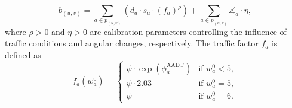 \documentclass[lettersize,journal]{IEEEtran}
\begin{document}
\begin{equation}
\label{cyclist_distance}
    b_{(u,v)} = \sum_{a \in p_{(u,v)}} \left( d_a \cdot s_a \cdot (f_a)^{\rho} \right) +  \sum_{a \in p_{(u,v)}} \measuredangle_a \cdot \eta,
\end{equation}
where $\rho > 0$ and $\eta > 0$ are calibration parameters controlling the influence of traffic conditions and angular changes, respectively.
The traffic factor $f_a$ is defined as
\begin{equation}
\label{f_a}
f_a(w_{a}^{0}) = 
     \begin{cases}
\psi \cdot \exp{\left( \phi^{\text{AADT}}_{a} \right)} & \text{if } w_{a}^{0} < 5, \\
\psi \cdot 2.03 & \text{if } w_{a}^{0} = 5, \\
\psi & \text{if } w_{a}^{0} = 6.
\end{cases}
\end{equation}
\end{document}
